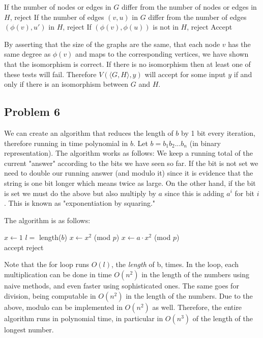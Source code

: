 \documentclass[english]{article}
\begin{document}
\begin{algorithmic}
\State If the number of nodes or edges in $G$ differ from the number of nodes
		or edges in $H$, reject
	\State If the number of edges $(v,u)$ in $G$ differ from the number of
			edges $(\phi(v),u')$ in $H$, reject
		\State If $(\phi(v),\phi(u))$ is not in $H$, reject
	\EndFor
\EndFor
\State Accept
\EndFunction 
\end{algorithmic}

By asserting that the size of the graphs are the same, that each node $v$ has
the same degree as $\phi(v)$ and maps to the corresponding vertices, we have
shown that the isomorphism is correct. If there is no isomorphism then at
least one of these tests will fail. Therefore $V(\langle G, H \rangle,y)$
will accept for some input $y$ if and only if there is an isomorphism between
$G$ and $H$.

\subsection*{Problem 6}
We can create an algorithm that reduces the length of $b$ by 1 bit every iteration,
therefore running in time polynomial in $b$. Let $b=b_1b_2...b_n$ (in binary representation).
The algorithm works as follows: We keep a running total of the current "answer" according to
the bits we have seen so far. If the bit is not set we need to double our running answer (and
modulo it) since it is evidence that the string is one bit longer which means twice as large.
On the other hand, if the bit is set we must do the above but also multiply by $a$ since this
is adding $a^i$ for bit $i$. This is known as "exponentiation by squaring."

The algorithm is as follows:
\begin{algorithmic}
	\State $x \gets 1$
	\State $l = $ length($b$)
			\State $x \gets x^2$ (mod $p$)
		\Else
			\State $x \gets a \cdot x^2$ (mod $p$)
		\EndIf
	\EndFor \\
	
		\State accept
	\Else
		\State reject
	\EndIf
\end{algorithmic}

Note that the for loop runs $O(l)$, the \emph{length} of b, times.
In the loop, each multiplication can be done in time $O(n^2)$ in the length of the numbers using
naive methods, and even faster using sophisticated ones.
The same goes for division, being computable in $O(n^2)$ in the length of the numbers.
Due to the above, modulo can be implemented in $O(n^2)$ as well.
Therefore, the entire algorithm runs in polynomial time, in particular in $O(n^3)$ of the
length of the longest number.
\end{document}
